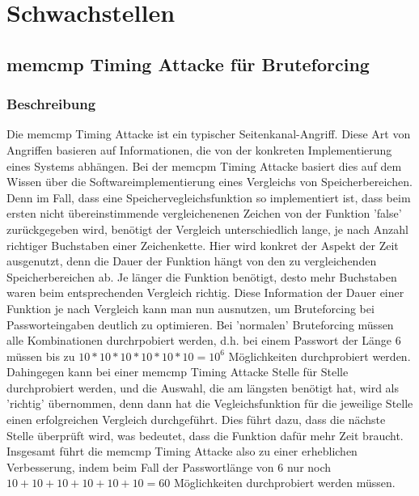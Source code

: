 \documentclass[a4paper,
DIV=13,
12pt,
BCOR=10mm,
department=FakIM,
oneside,
parskip=half,
automark,
listof=totocnumbered,
bibliography=totocnumbered,
acronym=totocnumbered
] {OTHRartcl}
\begin{document}



\section{Schwachstellen}
\subsection{memcmp Timing Attacke für Bruteforcing}
\subsubsection{Beschreibung}
Die memcmp Timing Attacke ist ein typischer Seitenkanal-Angriff. Diese Art von Angriffen basieren auf Informationen, die von der konkreten Implementierung eines Systems abhängen.
Bei der memcpm Timing Attacke basiert dies auf dem Wissen über die Softwareimplementierung eines Vergleichs von Speicherbereichen.
Denn im Fall, dass eine Speichervegleichsfunktion so implementiert ist, dass beim ersten nicht übereinstimmende vergleichenenen Zeichen von der Funktion 'false' zurückgegeben wird,
benötigt der Vergleich unterschiedlich lange, je nach Anzahl richtiger Buchstaben einer Zeichenkette.
Hier wird konkret der Aspekt der Zeit ausgenutzt, denn die Dauer der Funktion hängt von den zu vergleichenden Speicherbereichen ab.
Je länger die Funktion benötigt, desto mehr Buchstaben waren beim entsprechenden Vergleich richtig.
Diese Information der Dauer einer Funktion je nach Vergleich kann man nun ausnutzen, um Bruteforcing bei Passworteingaben deutlich zu optimieren.
Bei 'normalen' Bruteforcing müssen alle Kombinationen durchrpobiert werden, d.h.
bei einem Passwort der Länge 6 müssen bis zu $10*10*10*10*10*10 = 10^6$ Möglichkeiten durchprobiert werden.
Dahingegen kann bei einer memcmp Timing Attacke Stelle für Stelle durchprobiert werden, und die Auswahl, die am längsten benötigt hat,
wird als 'richtig' übernommen, denn dann hat die Vegleichsfunktion für die jeweilige Stelle einen erfolgreichen Vergleich durchgeführt.
Dies führt dazu, dass die nächste Stelle überprüft wird, was bedeutet, dass die Funktion dafür mehr Zeit braucht.
Insgesamt führt die memcmp Timing Attacke also zu einer erheblichen Verbesserung, indem beim Fall der Passwortlänge von 6
nur noch $ 10+10+10+10+10+10 = 60 $ Möglichkeiten durchprobiert werden müssen.
\end{document}
